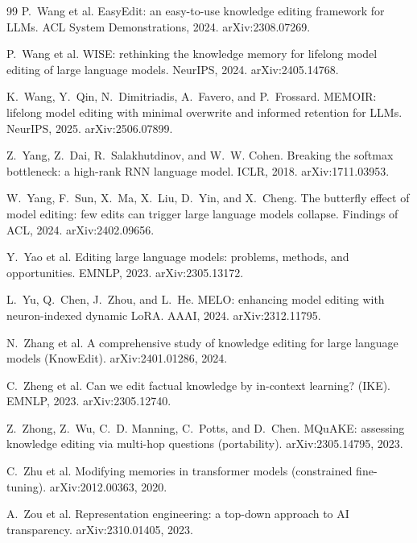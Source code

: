 \documentclass[10pt,twocolumn]{article}
\theoremstyle{remark}
\begin{document}
\begin{thebibliography}{99}
P.~Wang et al.
\newblock EasyEdit: an easy-to-use knowledge editing framework for LLMs.
\newblock ACL System Demonstrations, 2024. arXiv:2308.07269.

P.~Wang et al.
\newblock WISE: rethinking the knowledge memory for lifelong model editing of large language models.
\newblock NeurIPS, 2024. arXiv:2405.14768.

K.~Wang, Y.~Qin, N.~Dimitriadis, A.~Favero, and P.~Frossard.
\newblock MEMOIR: lifelong model editing with minimal overwrite and informed retention for LLMs.
\newblock NeurIPS, 2025. arXiv:2506.07899.

Z.~Yang, Z.~Dai, R.~Salakhutdinov, and W.~W. Cohen.
\newblock Breaking the softmax bottleneck: a high-rank RNN language model.
\newblock ICLR, 2018. arXiv:1711.03953.

W.~Yang, F.~Sun, X.~Ma, X.~Liu, D.~Yin, and X.~Cheng.
\newblock The butterfly effect of model editing: few edits can trigger large language models collapse.
\newblock Findings of ACL, 2024. arXiv:2402.09656.

Y.~Yao et al.
\newblock Editing large language models: problems, methods, and opportunities.
\newblock EMNLP, 2023. arXiv:2305.13172.

L.~Yu, Q.~Chen, J.~Zhou, and L.~He.
\newblock MELO: enhancing model editing with neuron-indexed dynamic LoRA.
\newblock AAAI, 2024. arXiv:2312.11795.

N.~Zhang et al.
\newblock A comprehensive study of knowledge editing for large language models (KnowEdit).
\newblock arXiv:2401.01286, 2024.

C.~Zheng et al.
\newblock Can we edit factual knowledge by in-context learning? (IKE).
\newblock EMNLP, 2023. arXiv:2305.12740.

Z.~Zhong, Z.~Wu, C.~D. Manning, C.~Potts, and D.~Chen.
\newblock MQuAKE: assessing knowledge editing via multi-hop questions (portability).
\newblock arXiv:2305.14795, 2023.

C.~Zhu et al.
\newblock Modifying memories in transformer models (constrained fine-tuning).
\newblock arXiv:2012.00363, 2020.

A.~Zou et al.
\newblock Representation engineering: a top-down approach to AI transparency.
\newblock arXiv:2310.01405, 2023.
\end{thebibliography}
\end{document}
